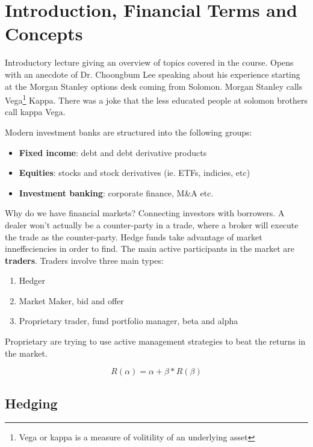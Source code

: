 \section{Introduction, Financial Terms and Concepts} %

Introductory lecture giving an overview of topics covered in the course. Opens
with an anecdote of Dr. Choongbum Lee speaking about his experience starting
at the Morgan Stanley options desk coming from Solomon. Morgan Stanley calls
Vega\footnote{Vega or kappa is a measure of volitility of an underlying asset}
Kappa. There was a joke that the less educated people at solomon brothers call
kappa Vega.

Modern investment banks are structured into the following groups:

\begin{itemize}
  \item \textbf{Fixed income}: debt and debt derivative products
  \item \textbf{Equities}: stocks and stock derivatives (ie. ETFs, indicies, etc)
  \item \textbf{Investment banking}: corporate finance, M\&A etc.
\end{itemize}

Why do we have financial markets? Connecting investors with borrowers. A dealer
won't actually be a counter-party in a trade, where a broker will execute the
trade as the counter-party. Hedge funds take advantage of market inneffeciencies
in order to find. The main active participants in the market are
\textbf{traders}. Traders involve three main types:

\begin{enumerate}
  \item Hedger
  \item Market Maker, bid and offer
  \item Proprietary trader, fund portfolio manager, beta and alpha
\end{enumerate}

Proprietary are trying to use active management strategies to beat the returns
in the market. 

\begin{equation} 
  R(\alpha) = \alpha + \beta *R(\beta)
\end{equation}

\subsection{Hedging}

